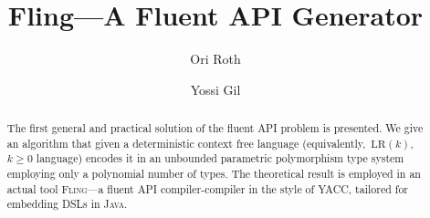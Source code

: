 \documentclass[a4paper,UKenglish,cleveref, autoref]{darts-v2019}
\title{Fling---A Fluent API Generator}
\author{Ori Roth}{Technion I.I.T Computer Science Dept., Haifa, Israel}{ori.rothh@gmail.com}{}{Technion I.I.T}%
\author{Yossi Gil}{Technion I.I.T Computer Science Dept., Haifa, Israel}{yogi@cs.technion.ac.il}{}{Technion I.I.T}
\newcommand{\Fling}{F\textsc{ling}\xspace}
\begin{document}
\maketitle

\begin{abstract}
The first general and practical solution of the fluent API problem is
presented. We give an algorithm that given a deterministic context free
language (equivalently,~$\text{LR}(k)$,~$k\ge 0$ language) encodes it in an
unbounded parametric polymorphism type system employing only a polynomial
number of types. The theoretical result is employed in an actual tool
\Fling---a fluent API compiler-compiler in the style of YACC, tailored for
embedding DSLs in \textsc{Java}.


\end{abstract}

\end{document}
